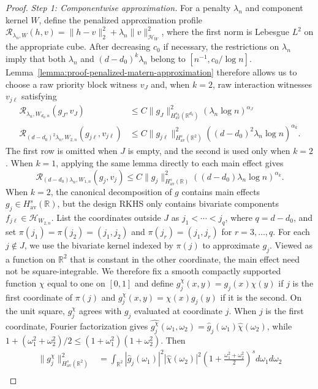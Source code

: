 \documentclass[letterpaper,12pt]{article}
\theoremstyle{definition}
\numberwithin{equation}{section}
\newcommand{\mr}{\mathbb{R}}
\newcommand{\mc}{\mathcal}
\newcommand{\norm}[1]{\lVert#1\rVert}
\begin{document}
\begin{proof}
\emph{Step 1: Componentwise approximation.}
For a penalty $\lambda_n$ and component kernel $W$, define the penalized approximation profile $\mathcal R_{\lambda_n,W}(h,v)=\norm{h-v}_2^2+\lambda_n\norm{v}_{\mc H_W}^2$, where the first norm is Lebesgue $L^2$ on the appropriate cube.
After decreasing $c_0$ if necessary, the restrictions on $\lambda_n$ imply that both $\lambda_n$ and $(d-d_0)^k\lambda_n$ belong to $[n^{-1},c_0/\log n]$.
Lemma~\ref{lemma:proof-penalized-matern-approximation} therefore allows us to choose a raw priority block witness $v_J$ and, when $k=2$, raw interaction witnesses $v_{j\ell}$ satisfying
\begin{align*}
\mathcal R_{\lambda_n,W_{d_0,n}}(g_J,v_J)&\leq C\norm{g_J}_{H_{\mathrm{av}}^{s_0}(\mr^{d_0})}^2(\lambda_n\log n)^{\alpha_J}\\
\mathcal R_{(d-d_0)^2\lambda_n,W_{2,n}}(g_{j\ell},v_{j\ell})&\leq C\norm{g_{j\ell}}_{H_{\mathrm{av}}^s(\mr^2)}^2((d-d_0)^2\lambda_n\log n)^{\alpha_k}.
\end{align*}
The first row is omitted when $J$ is empty, and the second is used only when $k=2$.
When $k=1$, applying the same lemma directly to each main effect gives
\begin{equation*}
\mathcal R_{(d-d_0)\lambda_n,W_{1,n}}(g_j,v_j)\leq C\norm{g_j}_{H_{\mathrm{av}}^s(\mr)}^2((d-d_0)\lambda_n\log n)^{\alpha_k}.
\end{equation*}
When $k=2$, the canonical decomposition of $g$ contains main effects $g_j\in H_{\mathrm{av}}^s(\mr)$, but the design RKHS only contains bivariate components $f_{j\ell}\in\mc H_{W_{2,n}}$.
List the coordinates outside $J$ as $j_1<\cdots<j_q$, where $q=d-d_0$, and set $\pi(j_1)=\pi(j_2)=(j_1,j_2)$ and $\pi(j_r)=(j_1,j_r)$ for $r=3,\ldots,q$.
For each $j\notin J$, we use the bivariate kernel indexed by $\pi(j)$ to approximate $g_j$.
Viewed as a function on $\mr^2$ that is constant in the other coordinate, the main effect need not be square-integrable.
We therefore fix a smooth compactly supported function $\chi$ equal to one on $[0,1]$ and define $g_j^\chi(x,y)=g_j(x)\chi(y)$ if $j$ is the first coordinate of $\pi(j)$ and $g_j^\chi(x,y)=\chi(x)g_j(y)$ if it is the second.
On the unit square, $g_j^\chi$ agrees with $g_j$ evaluated at coordinate $j$.
When $j$ is the first coordinate, Fourier factorization gives $\widehat{g_j^\chi}(\omega_1,\omega_2)=\widehat g_j(\omega_1)\widehat\chi(\omega_2)$, while $1+(\omega_1^2+\omega_2^2)/2\leq(1+\omega_1^2)(1+\omega_2^2)$.
Then
\begin{align*}
\norm{g_j^\chi}_{H_{\mathrm{av}}^s(\mr^2)}^2&=\int_{\mr^2}|\widehat g_j(\omega_1)|^2|\widehat\chi(\omega_2)|^2\left(1+\frac{\omega_1^2+\omega_2^2}{2}\right)^sd\omega_1d\omega_2\\

\end{align*}
\end{proof}
\end{document}
